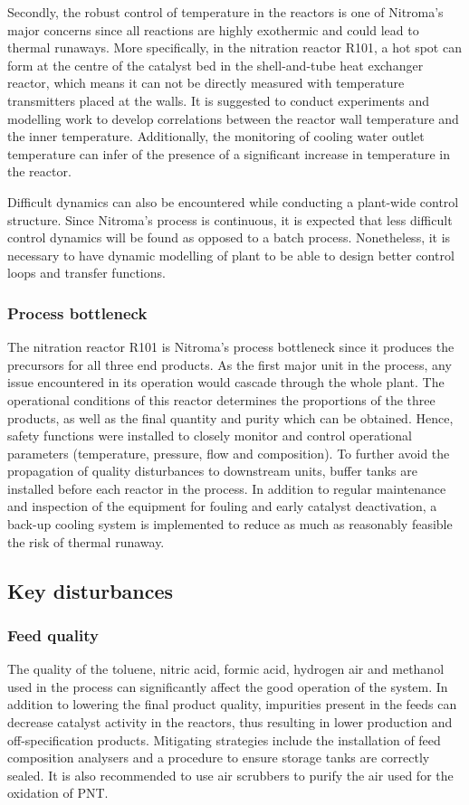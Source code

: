 Secondly, the robust control of temperature in the reactors is one of Nitroma's major concerns since all reactions are highly exothermic and could lead to thermal runaways. More specifically, in the nitration reactor R101, a hot spot can form at the centre of the catalyst bed in the shell-and-tube heat exchanger reactor, which means it can not be directly measured with temperature transmitters placed at the walls. It is suggested to conduct experiments and modelling work to develop correlations between the reactor wall temperature and the inner temperature. Additionally, the monitoring of cooling water outlet temperature can infer of the presence of a significant increase in temperature in the reactor.

Difficult dynamics can also be encountered while conducting a plant-wide control structure. Since Nitroma's process is continuous, it is expected that less difficult control dynamics will be found as opposed to a batch process. Nonetheless, it is necessary to have dynamic modelling of plant to be able to design better control loops and transfer functions.


\subsubsection{Process bottleneck} %
The nitration reactor R101 is Nitroma's process bottleneck since it produces the precursors for all three end products. As the first major unit in the process, any issue encountered in its operation would cascade through the whole plant. The operational conditions of this reactor determines the proportions of the three products, as well as the final quantity and purity which can be obtained. Hence, safety functions were installed to closely monitor and control operational parameters (temperature, pressure, flow and composition). To further avoid the propagation of quality disturbances to downstream units, buffer tanks are installed before each reactor in the process. In addition to regular maintenance and inspection of the equipment for fouling and early catalyst deactivation, a back-up cooling system is implemented to reduce as much as reasonably feasible the risk of thermal runaway.


\subsection{Key disturbances} %

\subsubsection{Feed quality}
The quality of the toluene, nitric acid, formic acid, hydrogen air and methanol used in the process can significantly affect the good operation of the system. In addition to lowering the final product quality, impurities present in the feeds can decrease catalyst activity in the reactors, thus resulting in lower production and off-specification products. Mitigating strategies include the installation of feed composition analysers and a procedure to ensure storage tanks are correctly sealed. It is also recommended to use air scrubbers to purify the air used for the oxidation of PNT.

